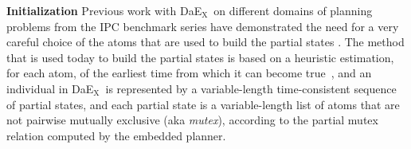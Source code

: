\documentclass{llncs}
\def\DAEX{{\sc DaE$_{\text{X}}$}}
\renewcommand{\paragraph}[1]{{\bf #1}}
\begin{document}
\paragraph{Initialization} Previous work with \DAEX\ on different domains of planning problems from the
IPC benchmark series have demonstrated the need for a very careful choice of the atoms that are used to build the partial states \cite{bibai-EvoCOP2010}. 
The method that is used today to build the partial states is based on a heuristic estimation, for each atom, of the earliest time from which it can become true~\cite{Haslum2000}, 
%
and an individual in \DAEX\ is represented by a variable-length time-consistent sequence of partial states, and each partial state is a variable-length list of atoms that are not pairwise mutually exclusive (aka {\em mutex}), according to the partial mutex relation computed by the embedded planner. 


\noindent
\end{document}
